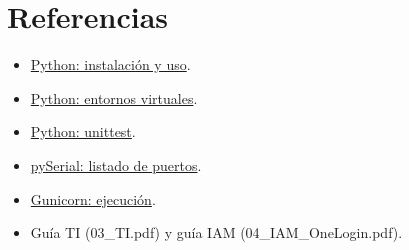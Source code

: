 \documentclass[12pt,a4paper]{article}
\begin{document}
\section*{Referencias}
\begin{itemize}
\item \href{https://docs.python.org/3/using/index.html}{Python: instalación y uso}.
\item \href{https://docs.python.org/3/library/venv.html}{Python: entornos virtuales}.
\item \href{https://docs.python.org/3/library/unittest.html}{Python: unittest}.
\item \href{https://pyserial.readthedocs.io/en/latest/tools.html#serial-tools-list-ports}{pySerial: listado de puertos}.
\item \href{https://docs.gunicorn.org/en/stable/run.html}{Gunicorn: ejecución}.
\item Guía TI (03\_TI.pdf) y guía IAM (04\_IAM\_OneLogin.pdf).
\end{itemize}
\end{document}
